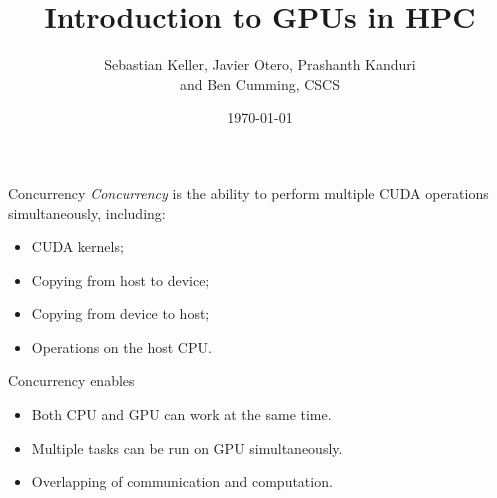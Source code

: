 \documentclass[aspectratio=43]{beamer}
\author{Sebastian Keller, Javier Otero, Prashanth Kanduri\\ and Ben Cumming, CSCS}
\title{Introduction to GPUs in HPC}
\subtitle{}
\date{\today}
\begin{document}
\cscstitle


\begin{frame}[fragile]{Concurrency}
    \emph{Concurrency} is the ability to perform multiple CUDA operations simultaneously, including:
    \begin{itemize}
        \item CUDA kernels;
        \item Copying from host to device;
        \item Copying from device to host;
        \item Operations on the host CPU.
    \end{itemize}

    \begin{info}{Concurrency enables}
        \begin{itemize}
            \item Both CPU and GPU can work at the same time.
            \item Multiple tasks can be run on GPU simultaneously.
            \item Overlapping of communication and computation.
        \end{itemize}
    \end{info}

\end{frame}
\end{document}
